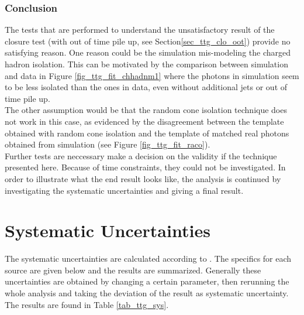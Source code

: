 \subsubsection{Conclusion}

The tests that are performed to understand the unsatisfactory result of the closure test (with out of time pile up, see Section\ref{sec_ttg_clo_oot}) provide no satisfying reason. One reason could be the simulation mis-modeling the charged hadron isolation. This can be motivated by the comparison between simulation and data in Figure \ref{fig_ttg_fit_chhadnm1} where the photons in simulation seem to be less isolated than the ones in data, even without additional jets or out of time pile up. \\
The other assumption would be that the random cone isolation technique does not work in this case, as evidenced by the disagreement between the template obtained with random cone isolation and the template of matched real photons obtained from simulation (see Figure \ref{fig_ttg_fit_raco}). \\ 
Further tests are neccessary make a decision on the validity if the technique presented here. Because of time constraints, they could not be investigated. In order to illustrate what the end result looks like, the analysis is continued by investigating the systematic uncertainties and giving a final result.

\section{Systematic Uncertainties}

The systematic uncertainties are calculated according to \cite{CMS-PAS-TOP-13-011}. The specifics for each source are given below and the results are summarized. Generally these uncertainties are obtained by changing a certain parameter, then rerunning the whole analysis and taking the deviation of the result as systematic uncertainty. The results are found in Table \ref{tab_ttg_sys}.

